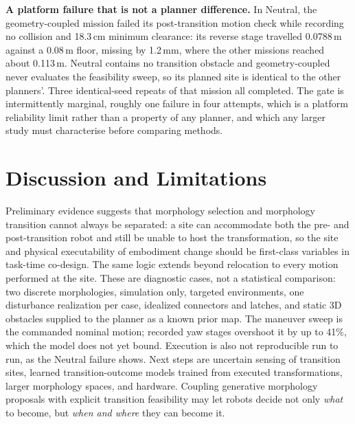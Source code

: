 \documentclass[conference]{IEEEtran}
\begin{document}
\textbf{A platform failure that is not a planner difference.} In Neutral, the geometry-coupled mission failed its post-transition motion check while recording no collision and 18.3\,cm minimum clearance: its reverse stage travelled 0.0788\,m against a 0.08\,m floor, missing by 1.2\,mm, where the other missions reached about 0.113\,m. Neutral contains no transition obstacle and geometry-coupled never evaluates the feasibility sweep, so its planned site is identical to the other planners'. Three identical-seed repeats of that mission all completed. The gate is intermittently marginal, roughly one failure in four attempts, which is a platform reliability limit rather than a property of any planner, and which any larger study must characterise before comparing methods.

\section{Discussion and Limitations}
Preliminary evidence suggests that morphology selection and morphology transition cannot always be separated: a site can accommodate both the pre- and post-transition robot and still be unable to host the transformation, so the site and physical executability of embodiment change should be first-class variables in task-time co-design. The same logic extends beyond relocation to every motion performed at the site. These are diagnostic cases, not a statistical comparison: two discrete morphologies, simulation only, targeted environments, one disturbance realization per case, idealized connectors and latches, and static 3D obstacles supplied to the planner as a known prior map. The maneuver sweep is the commanded nominal motion; recorded yaw stages overshoot it by up to 41\%, which the model does not yet bound. Execution is also not reproducible run to run, as the Neutral failure shows. Next steps are uncertain sensing of transition sites, learned transition-outcome models trained from executed transformations, larger morphology spaces, and hardware. Coupling generative morphology proposals with explicit transition feasibility may let robots decide not only \emph{what} to become, but \emph{when and where} they can become it.
\end{document}
